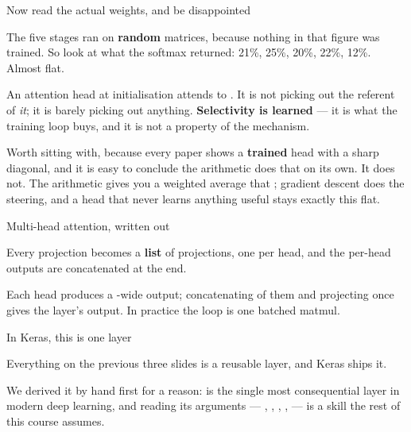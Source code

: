 \documentclass[aspectratio=169,11pt,t]{beamer}
\begin{document}
\begin{frame}[shrink=25]{Now read the actual weights, and be disappointed}
{\fontsize{9.4}{12.6}\selectfont\color{fg2}The five stages ran on \textbf{random} matrices, because nothing in that figure was trained. So look at what the softmax returned: 21\%, 25\%, 20\%, 22\%, 12\%. Almost flat.\par}\vskip 4pt
\begin{iband}[signal]
An attention head at initialisation attends to . It is not picking out the referent of \textit{it}; it is barely picking out anything. \textbf{Selectivity is learned} --- it is what the training loop buys, and it is not a property of the mechanism.
\end{iband}
{\fontsize{9.4}{12.6}\selectfont\color{fg2}Worth sitting with, because every paper shows a \textbf{trained} head with a sharp diagonal, and it is easy to conclude the arithmetic does that on its own. It does not. The arithmetic gives you a weighted average that ; gradient descent does the steering, and a head that never learns anything useful stays exactly this flat.\par}\vskip 4pt
\end{frame}

\begin{frame}[shrink=25]{Multi-head attention, written out}
{\fontsize{9.4}{12.6}\selectfont\color{fg2}Every projection becomes a \textbf{list} of projections, one per head, and the per-head outputs are concatenated at the end.\par}\vskip 4pt
{\fontsize{9.4}{12.6}\selectfont\color{fg2}Each head produces a -wide output; concatenating  of them and projecting once gives the layer's output. In practice the loop is one batched matmul.\par}\vskip 4pt
\end{frame}

\begin{frame}[shrink=25]{In Keras, this is one layer}
{\fontsize{9.4}{12.6}\selectfont\color{fg2}Everything on the previous three slides is a reusable layer, and Keras ships it.\par}\vskip 4pt
{\fontsize{9.4}{12.6}\selectfont\color{fg2}We derived it by hand first for a reason:  is the single most consequential layer in modern deep learning, and reading its arguments --- , , , ,  --- is a skill the rest of this course assumes.\par}\vskip 4pt
\end{frame}
\end{document}
